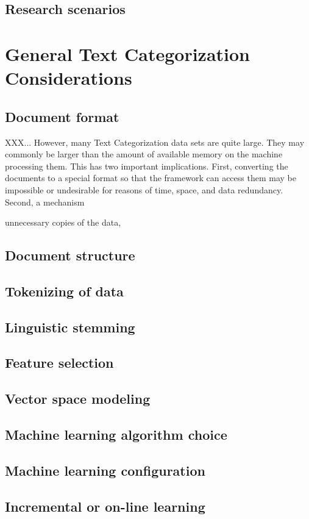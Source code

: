 \documentclass[a4paper]{report}
\begin{document}
\subsection{Research scenarios}

\section{General Text Categorization Considerations}
\subsection{Document format}
\label{Document format}

XXX... However, many Text Categorization data sets are quite large.  They may
commonly be larger than the amount of available memory on the machine
processing them.  This has two important implications.  First,
converting the documents to a special format so that the framework can
access them may be impossible or undesirable for reasons of time,
space, and data redundancy.  Second, a mechanism 

unnecessary copies of the data, 

\subsection{Document structure}
\subsection{Tokenizing of data}
\subsection{Linguistic stemming}
\subsection{Feature selection}
\subsection{Vector space modeling}
\subsection{Machine learning algorithm choice}
\subsection{Machine learning configuration}
\subsection{Incremental or on-line learning}
\end{document}
